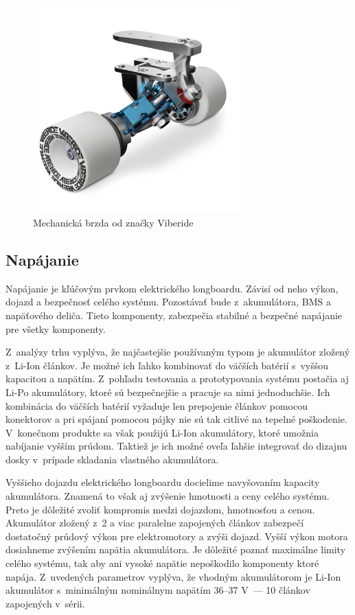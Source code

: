 \begin{figure}
    \centering
    \includegraphics[height=8cm]{obrazky-figures/mechanic-brake.png}
    \caption{Mechanická brzda od značky Viberide\cite{Viberide}}\label{fig:mechanic-brake}
\end{figure}

\subsection{Napájanie}
Napájanie je kľúčovým prvkom elektrického longboardu.
Závisí od neho výkon, dojazd a bezpečnosť celého systému.
Pozostávať bude z~akumulátora, BMS a napäťového deliča.
Tieto komponenty, zabezpečia stabilné a bezpečné napájanie pre všetky komponenty.

Z~analýzy trhu vyplýva, že najčastejšie používaným typom je akumulátor zložený z~Li-Ion článkov.
Je možné ich ľahko kombinovať do väčších batérií s~vyššou kapacitou a napätím.
Z~pohľadu testovania a prototypovania systému postačia aj Li-Po akumulátory, ktoré sú bezpečnejšie a pracuje sa nimi jednoduchšie.
Ich kombinácia do väčších batérií vyžaduje len prepojenie článkov pomocou konektorov a pri spájaní pomocou pájky nie sú tak citlivé na tepelné poškodenie.
V~konečnom produkte sa však použijú Li-Ion akumulátory, ktoré umožnia nabíjanie vyšším prúdom. 
Taktiež je ich možné oveľa ľahšie integrovať do dizajnu dosky v~prípade skladania vlastného akumulátora.

Vyššieho dojazdu elektrického longboardu docielime navyšovaním kapacity akumulátora. 
Znamená to však aj zvýšenie hmotnosti a ceny celého systému.
Preto je dôležité zvoliť kompromis medzi dojazdom, hmotnosťou a cenou.
Akumulátor zložený z~2 a viac paralelne zapojených článkov zabezpečí dostatočný prúdový výkon pre elektromotory a zvýši dojazd.
Vyšší výkon motora dosiahneme zvýšením napätia akumulátora.
Je dôležité poznať maximálne limity celého systému, tak aby ani vysoké napätie nepoškodilo komponenty ktoré napája.
Z~uvedených parametrov vyplýva, že vhodným akumulátorom je Li-Ion akumulátor s~minimálným nominálnym napätím 36--37 V~--- 10 článkov zapojených v~sérii.

